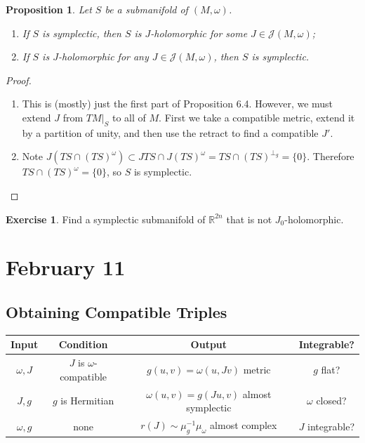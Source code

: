 \documentclass[leqno, openany]{memoir}
\newtheorem{prop}[thm]{Proposition}
\theoremstyle{definition}
\newtheorem{exer}[thm]{Exercise}
\theoremstyle{remark}
\theoremstyle{plain}
\theoremstyle{definition}
\theoremstyle{remark}
\newcommand{\R}{\mathbb{R}}
\newcommand{\mc}[1]{\mathcal{#1}}
\begin{document}
\begin{prop} Let $S$ be a submanifold of $(M, \omega)$.  \begin{enumerate}
    \item If $S$ is symplectic, then $S$ is $J$-holomorphic for some $J \in
        \mc{J}(M, \omega)$; \item If $S$ is $J$-holomorphic for any $J \in
        \mc{J}(M, \omega)$, then $S$ is symplectic.  \end{enumerate} \end{prop}

\begin{proof} \begin{enumerate} \item This is (mostly) just the first part of
    Proposition 6.4. However, we must extend $J$ from $TM|_S$ to all of $M$.
    First we take a compatible metric, extend it by a partition of unity, and
    then use the retract to find a compatible $J'$.  \item Note $J(TS \cap
    (TS)^{\omega}) \subset JTS \cap J(TS)^{\omega} = TS \cap (TS)^{\perp_g} =
    \{0\}$. Therefore $TS \cap (TS)^{\omega} = \{0\}$, so $S$ is symplectic.
    \end{enumerate} \end{proof}

\begin{exer} Find a symplectic submanifold of $\R^{2n}$ that is not
$J_0$-holomorphic.  \end{exer}

\chapter{February 11}%

\section{Obtaining Compatible Triples}%
\label{sec:obtaining_compatible_triples}

\begin{center} \begin{tabular}{cccc} \toprule Input & Condition & Output &
    Integrable? \\ \midrule $\omega, J$ & $J$ is $\omega$-compatible  & $g(u,v)
    = \omega(u, Jv)$ metric & $g$ flat? \\ $J, g$ & $g$ is Hermitian &
    $\omega(u,v) = g(Ju,v)$ almost symplectic & $\omega$ closed? \\ $\omega, g$
                                              & none & $r(J) \sim \mu_g^{-1}
\mu_{\omega}$ almost complex & $J$ integrable? \\ \bottomrule \end{tabular}
\end{center}
\end{document}
